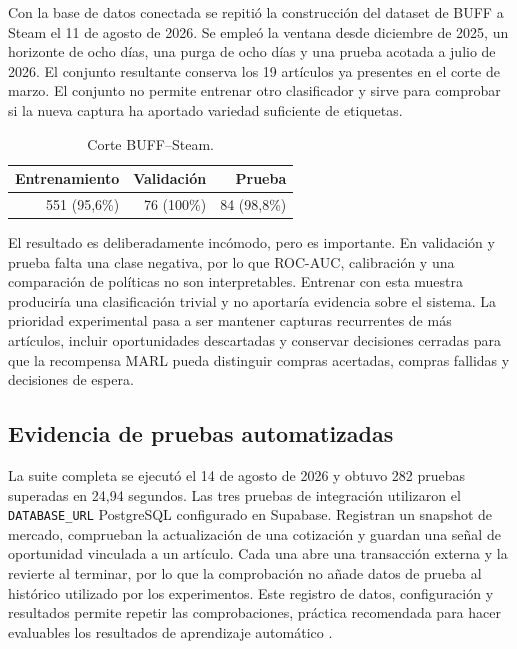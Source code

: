 Con la base de datos conectada se repitió la construcción del dataset de BUFF a Steam el 11 de agosto de 2026. Se empleó la ventana desde diciembre de 2025, un horizonte de ocho días, una purga de ocho días y una prueba acotada a julio de 2026. El conjunto resultante conserva los 19 artículos ya presentes en el corte de marzo. El conjunto no permite entrenar otro clasificador y sirve para comprobar si la nueva captura ha aportado variedad suficiente de etiquetas.

\begin{table}[htbp]
\centering
\begin{tabular}{r r r}
\toprule
Entrenamiento & Validación & Prueba \\
\midrule
551 (95,6\%) & 76 (100\%) & 84 (98,8\%) \\
\bottomrule
\end{tabular}
\caption{Corte BUFF--Steam.}
\label{tab:corte-reciente}
\end{table}

El resultado es deliberadamente incómodo, pero es importante. En validación y prueba falta una clase negativa, por lo que ROC-AUC, calibración y una comparación de políticas no son interpretables. Entrenar con esta muestra produciría una clasificación trivial y no aportaría evidencia sobre el sistema. La prioridad experimental pasa a ser mantener capturas recurrentes de más artículos, incluir oportunidades descartadas y conservar decisiones cerradas para que la recompensa MARL pueda distinguir compras acertadas, compras fallidas y decisiones de espera.

\subsection{Evidencia de pruebas automatizadas}

La suite completa se ejecutó el 14 de agosto de 2026 y obtuvo 282 pruebas superadas en 24,94 segundos. Las tres pruebas de integración utilizaron el \texttt{DATABASE\_URL} PostgreSQL configurado en Supabase. Registran un snapshot de mercado, comprueban la actualización de una cotización y guardan una señal de oportunidad vinculada a un artículo. Cada una abre una transacción externa y la revierte al terminar, por lo que la comprobación no añade datos de prueba al histórico utilizado por los experimentos. Este registro de datos, configuración y resultados permite repetir las comprobaciones, práctica recomendada para hacer evaluables los resultados de aprendizaje automático \cite{pineau2021reproducibility}.

